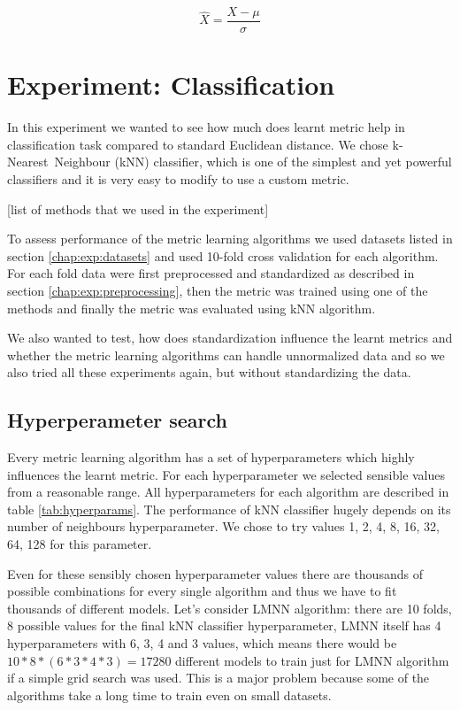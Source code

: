 \documentclass[12pt,a4paper]{report}
\begin{document}
\begin{equation} \label{eq:stand}
\hat{X} = \frac{X-\mu}{\sigma}
\end{equation}

\section{Experiment: Classification} \label{chap:exp:classification}

In this experiment we wanted to see how much does learnt metric help in classification task compared to standard Euclidean distance. We chose k-Nearest~Neighbour (kNN) classifier, which is one of the simplest and yet powerful classifiers and it is very easy to modify to use a custom metric.

[list of methods that we used in the experiment] %

To assess performance of the metric learning algorithms we used datasets listed in section \ref{chap:exp:datasets} and used 10-fold cross validation for each algorithm. For each fold data were first preprocessed and standardized as described in section \ref{chap:exp:preprocessing}, then the metric was trained using one of the methods and finally the metric was evaluated using kNN algorithm.

We also wanted to test, how does standardization influence the learnt metrics and whether the metric learning algorithms can handle unnormalized data and so we also tried all these experiments again, but without standardizing the data.

\subsection{Hyperperameter search} \label{chap:exp:hypsearch}

Every metric learning algorithm has a set of hyperparameters which highly influences the learnt metric. For each hyperparameter we selected sensible values from a reasonable range. All hyperparameters for each algorithm are described in table \ref{tab:hyperparams}. The performance of kNN classifier hugely depends on its number of neighbours hyperparameter. We chose to try values 1, 2, 4, 8, 16, 32, 64, 128 for this parameter.



Even for these sensibly chosen hyperparameter values there are thousands of possible combinations for every single algorithm and thus we have to fit thousands of different models. Let’s consider LMNN algorithm: there are 10 folds, 8 possible values for the final kNN classifier hyperparameter, LMNN itself has 4 hyperparameters with 6, 3, 4 and 3 values, which means there would be $10*8*(6*3*4*3)=17280$ different models to train just for LMNN algorithm if a simple grid search was used. This is a major problem because some of the algorithms take a long time to train even on small datasets.
\end{document}
